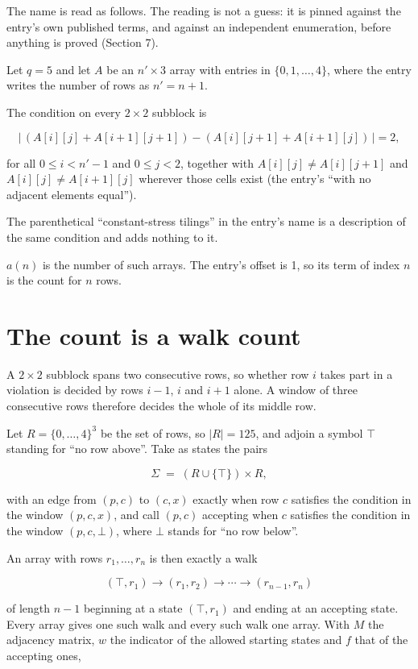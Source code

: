 \documentclass[11pt]{article}
\theoremstyle{definition}
\begin{document}
The name is read as follows. The reading is not a guess: it is pinned against the entry's own published terms, and against an independent enumeration, before anything is proved (Section 7).

Let $q = 5$ and let $A$ be an $n' \times 3$ array with entries in $\{0,1,\dots,4\}$, where the entry writes the number of rows as $n' = n + 1$.

The condition on every $2 \times 2$ subblock is

\[\bigl|\,(A[i][j] + A[i{+}1][j{+}1]) - (A[i][j{+}1] + A[i{+}1][j])\,\bigr| = 2,\]

for all $0 \le i < n'-1$ and $0 \le j < 2$, together with $A[i][j] \ne A[i][j{+}1]$ and $A[i][j] \ne A[i{+}1][j]$ wherever those cells exist (the entry's ``with no adjacent elements equal'').

The parenthetical ``constant-stress tilings'' in the entry's name is a description of the same condition and adds nothing to it.

$a(n)$ is the number of such arrays. The entry's offset is 1, so its term of index $n$ is the count for $n$ rows.

\section{The count is a walk count}

A $2 \times 2$ subblock spans two consecutive rows, so whether row $i$ takes part in a violation is decided by rows $i-1$, $i$ and $i+1$ alone. A window of three consecutive rows therefore decides the whole of its middle row.

Let $R = \{0,\dots,4\}^{3}$ be the set of rows, so $|R| = 125$, and adjoin a symbol $\top$ standing for ``no row above''. Take as states the pairs

\[\Sigma \;=\; (R \cup \{\top\}) \times R,\]

with an edge from $(p,c)$ to $(c,x)$ exactly when row $c$ satisfies the condition in the window $(p,c,x)$, and call $(p,c)$ accepting when $c$ satisfies the condition in the window $(p,c,\bot)$, where $\bot$ stands for ``no row below''.

An array with rows $r_1,\dots,r_n$ is then exactly a walk

\[(\top,r_1) \to (r_1,r_2) \to \cdots \to (r_{n-1},r_n)\]

of length $n-1$ beginning at a state $(\top,r_1)$ and ending at an accepting state. Every array gives one such walk and every such walk one array. With $M$ the adjacency matrix, $w$ the indicator of the allowed starting states and $f$ that of the accepting ones,
\end{document}
